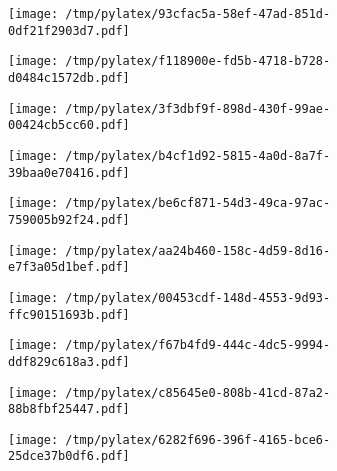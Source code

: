 \documentclass{article}
\begin{document}
\begin{figure}[htbp]
\begin{subfigure}[b]{.3\linewidth}
\texttt{[image: /tmp/pylatex/93cfac5a-58ef-47ad-851d-0df21f2903d7.pdf]}
\end{subfigure}
\begin{subfigure}[b]{.3\linewidth}
\texttt{[image: /tmp/pylatex/f118900e-fd5b-4718-b728-d0484c1572db.pdf]}
\end{subfigure}
\begin{subfigure}[b]{.3\linewidth}
\texttt{[image: /tmp/pylatex/3f3dbf9f-898d-430f-99ae-00424cb5cc60.pdf]}
\end{subfigure}
\begin{subfigure}[b]{.3\linewidth}
\texttt{[image: /tmp/pylatex/b4cf1d92-5815-4a0d-8a7f-39baa0e70416.pdf]}
\end{subfigure}
\begin{subfigure}[b]{.3\linewidth}
\texttt{[image: /tmp/pylatex/be6cf871-54d3-49ca-97ac-759005b92f24.pdf]}
\end{subfigure}
\begin{subfigure}[b]{.3\linewidth}
\texttt{[image: /tmp/pylatex/aa24b460-158c-4d59-8d16-e7f3a05d1bef.pdf]}
\end{subfigure}
\begin{subfigure}[b]{.3\linewidth}
\texttt{[image: /tmp/pylatex/00453cdf-148d-4553-9d93-ffc90151693b.pdf]}
\end{subfigure}
\begin{subfigure}[b]{.3\linewidth}
\texttt{[image: /tmp/pylatex/f67b4fd9-444c-4dc5-9994-ddf829c618a3.pdf]}
\end{subfigure}
\begin{subfigure}[b]{.3\linewidth}
\texttt{[image: /tmp/pylatex/c85645e0-808b-41cd-87a2-88b8fbf25447.pdf]}
\end{subfigure}
\begin{subfigure}[b]{.3\linewidth}
\texttt{[image: /tmp/pylatex/6282f696-396f-4165-bce6-25dce37b0df6.pdf]}
\end{subfigure}
\end{figure}
\end{document}
